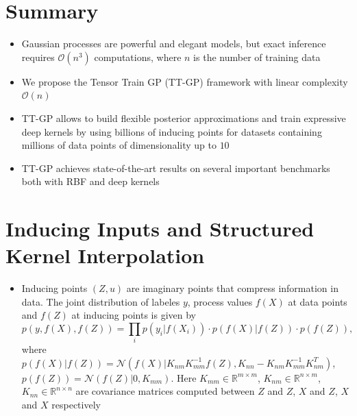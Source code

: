 \documentclass[a0,portrait]{a0poster}
\newcommand{\Knn}{K_{nn}}
\newcommand{\Knm}{K_{nm}}
\newcommand{\Kmm}{K_{mm}}
\newcommand{\R}{\mathbb{R}}
\newcommand{\N}{\mathcal{N}}
\newcommand{\bigO}{\mathcal{O}}
\begin{document}
\large


\begin{multicols}{2} %


%

\section*{\LARGE \color{NavyBlue}Summary}

\begin{itemize}
  \item Gaussian processes are powerful and elegant models, but exact inference 
    requires $\bigO(n^3)$ computations, where $n$ is the number of training data
  \item We propose the Tensor Train GP (TT-GP) framework with 
    linear complexity  $\bigO(n)$ 
  \item TT-GP allows to build flexible posterior approximations and train
    expressive deep kernels by using billions of inducing points for datasets
    containing millions of data points of dimensionality up to $10$
  \item TT-GP achieves state-of-the-art results on several important benchmarks
    both with RBF and deep kernels
\end{itemize}

\section*{\LARGE \color{NavyBlue}Inducing Inputs and Structured Kernel Interpolation}

\begin{itemize}
  \item Inducing points $(Z, u)$ are imaginary points that compress information in data.
    The joint distribution of labeles $y$, process values $f(X)$ at data points
    and $f(Z)$ at inducing points is given by
    \[
      p(y, f(X), f(Z)) = \prod_i p(y_i \vert f(X_i))\cdot p(f(X) \vert f(Z))\cdot p(f(Z)),
    \]
    where 
    $p(f(X) | f(Z)) = \N(f(X) | \Knm \Kmm^{-1} f(Z), \Knn - \Knm \Kmm^{-1} \Knm^T)$,
    $p(f(Z))= \N(f(Z) | 0, \Kmm)$. 
    Here $K_{mm} \in \R^{m \times m}$,
    $K_{nm} \in \R^{n \times m}$,
    $K_{nn} \in \R^{n \times n}$ are covariance matrices computed between $Z$ and $Z$,
    $X$ and $Z$, $X$ and $X$ respectively
  

\end{itemize}
\end{multicols}
\end{document}
